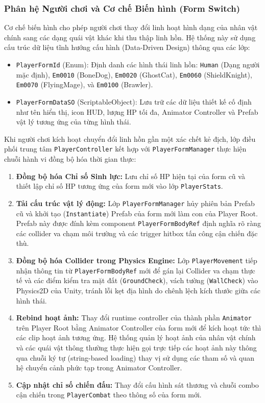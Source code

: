 \documentclass[../DoAn.tex]{subfiles}
\begin{document}
\subsubsection{Phân hệ Người chơi và Cơ chế Biến hình (Form Switch)}
Cơ chế biến hình cho phép người chơi thay đổi linh hoạt hình dạng của nhân vật chính sang các dạng quái vật khác khi thu thập linh hồn. Hệ thống này sử dụng cấu trúc dữ liệu tĩnh hướng cấu hình (Data-Driven Design) thông qua các lớp:
\begin{itemize}
    \item \texttt{PlayerFormId} (Enum): Định danh các hình thái linh hồn: \texttt{Human} (Dạng người mặc định), \texttt{Em0010} (BoneDog), \texttt{Em0020} (GhostCat), \texttt{Em0060} (ShieldKnight), \texttt{Em0070} (FlyingMage), và \texttt{Em0100} (Brawler).
    \item \texttt{PlayerFormDataSO} (ScriptableObject): Lưu trữ các dữ liệu thiết kế cố định như tên hiển thị, icon HUD, lượng HP tối đa, Animator Controller và Prefab vật lý tương ứng của từng hình thái.
\end{itemize}

Khi người chơi kích hoạt chuyển đổi linh hồn gần một xác chết kẻ địch, lớp điều phối trung tâm \texttt{PlayerController} kết hợp với \texttt{PlayerFormManager} thực hiện chuỗi hành vi đồng bộ hóa thời gian thực:
\begin{enumerate}
    \item \textbf{Đồng bộ hóa Chỉ số Sinh lực:} Lưu chỉ số HP hiện tại của form cũ và thiết lập chỉ số HP tương ứng của form mới vào lớp \texttt{PlayerStats}.
    \item \textbf{Tải cấu trúc vật lý động:} Lớp \texttt{PlayerFormManager} hủy phiên bản Prefab cũ và khởi tạo (\texttt{Instantiate}) Prefab của form mới làm con của Player Root. Prefab này được đính kèm component \texttt{PlayerFormBodyRef} định nghĩa rõ ràng các collider va chạm môi trường và các trigger hitbox tấn công cận chiến đặc thù.
    \item \textbf{Đồng bộ hóa Collider trong Physics Engine:} Lớp \texttt{PlayerMovement} tiếp nhận thông tin từ \texttt{PlayerFormBodyRef} mới để gán lại Collider va chạm thực tế và các điểm kiểm tra mặt đất (\texttt{GroundCheck}), vách tường (\texttt{WallCheck}) vào Physics2D của Unity, tránh lỗi kẹt địa hình do chênh lệch kích thước giữa các hình thái.
    \item \textbf{Rebind hoạt ảnh:} Thay đổi runtime controller của thành phần \texttt{Animator} trên Player Root bằng Animator Controller của form mới để kích hoạt tức thì các clip hoạt ảnh tương ứng. Hệ thống quản lý hoạt ảnh của nhân vật chính và các quái vật thông thường thực hiện gọi trực tiếp các hoạt ảnh này thông qua chuỗi ký tự (string-based loading) thay vị sử dụng các tham số và quan hệ chuyển cảnh phức tạp trong Animator Controller.
    \item \textbf{Cập nhật chỉ số chiến đấu:} Thay đổi cấu hình sát thương và chuỗi combo cận chiến trong \texttt{PlayerCombat} theo thông số của form mới.
\end{enumerate}
\end{document}
